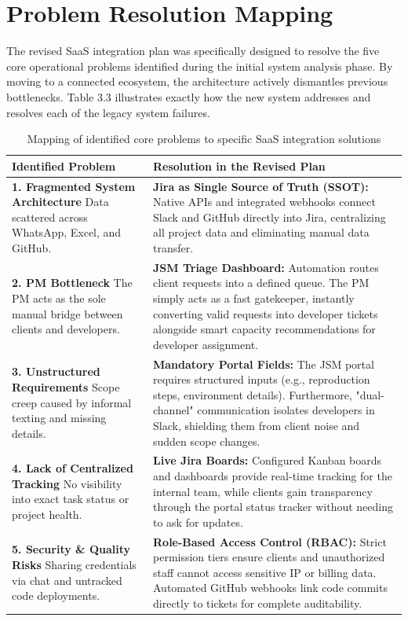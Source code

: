 \documentclass[12pt,a4paper]{report}
\begin{document}
\section{Problem Resolution Mapping}

The revised SaaS integration plan was specifically designed to resolve the five core operational problems identified during the initial system analysis phase. By moving to a connected ecosystem, the architecture actively dismantles previous bottlenecks. Table 3.3 illustrates exactly how the new system addresses and resolves each of the legacy system failures.

\begin{table}[H]
\centering
\renewcommand{\arraystretch}{1.4}
\small
\begin{tabularx}{\textwidth}{|p{4.5cm}|X|}
\hline
\rowcolor{secondary}
\textbf{Identified Problem} & \textbf{Resolution in the Revised Plan} \\
\hline
\textbf{1. Fragmented System Architecture} \newline Data scattered across WhatsApp, Excel, and GitHub. & \textbf{Jira as Single Source of Truth (SSOT):} Native APIs and integrated webhooks connect Slack and GitHub directly into Jira, centralizing all project data and eliminating manual data transfer. \\
\hline
\textbf{2. PM Bottleneck} \newline The PM acts as the sole manual bridge between clients and developers. & \textbf{JSM Triage Dashboard:} Automation routes client requests into a defined queue. The PM simply acts as a fast gatekeeper, instantly converting valid requests into developer tickets alongside smart capacity recommendations for developer assignment. \\
\hline
\textbf{3. Unstructured Requirements} \newline Scope creep caused by informal texting and missing details. & \textbf{Mandatory Portal Fields:} The JSM portal requires structured inputs (e.g., reproduction steps, environment details). Furthermore, "dual-channel" communication isolates developers in Slack, shielding them from client noise and sudden scope changes. \\
\hline
\textbf{4. Lack of Centralized Tracking} \newline No visibility into exact task status or project health. & \textbf{Live Jira Boards:} Configured Kanban boards and dashboards provide real-time tracking for the internal team, while clients gain transparency through the portal status tracker without needing to ask for updates. \\
\hline
\textbf{5. Security \& Quality Risks} \newline Sharing credentials via chat and untracked code deployments. & \textbf{Role-Based Access Control (RBAC):} Strict permission tiers ensure clients and unauthorized staff cannot access sensitive IP or billing data. Automated GitHub webhooks link code commits directly to tickets for complete auditability. \\
\hline
\end{tabularx}
\caption{Mapping of identified core problems to specific SaaS integration solutions}
\end{table}
\end{document}
